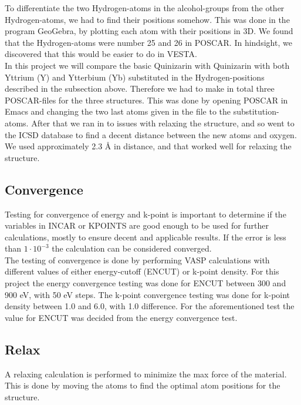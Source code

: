 \documentclass{article}
\begin{document}
  To differentiate the two Hydrogen-atoms in the alcohol-groups from the other Hydrogen-atoms, we had to find their positions somehow. This was done in the program GeoGebra, by plotting each atom with their positions in 3D. We found that the Hydrogen-atoms were number 25 and 26 in POSCAR. In hindsight, we discovered that this would be easier to do in VESTA. \\

  In this project we will compare the basic Quinizarin with Quinizarin with both Yttrium (Y) and Ytterbium (Yb) substituted in the Hydrogen-positions described in the subsection above. Therefore we had to make in total three POSCAR-files for the three structures. This was done by opening POSCAR in Emacs and changing the two last atoms given in the file to the substitution-atoms. After that we ran in to issues with relaxing the structure, and so went to the ICSD database to find a decent distance between the new atoms and oxygen. We used approximately 2.3 Å in distance, and that worked well for relaxing the structure. \\


  \subsection{Convergence}  \label{sec:Convergence}

    Testing for convergence of energy and k-point is important to determine if the variables in INCAR or KPOINTS are good enough to be used for further calculations, mostly to ensure decent and applicable results. If the error is less than $1\cdot 10^{-3}$ the calculation can be considered converged. \\

    The testing of convergence is done by performing VASP calculations with different values of either energy-cutoff (ENCUT) or k-point density. For this project the energy convergence testing was done for ENCUT between 300 and 900 eV, with 50 eV steps. The k-point convergence testing was done for k-point density between 1.0 and 6.0, with 1.0 difference. For the aforementioned test the value for ENCUT was decided from the energy convergence test. \\


  \subsection{Relax}

    A relaxing calculation is performed to minimize the max force of the material. This is done by moving the atoms to find the optimal atom positions for the structure. \\
\end{document}
